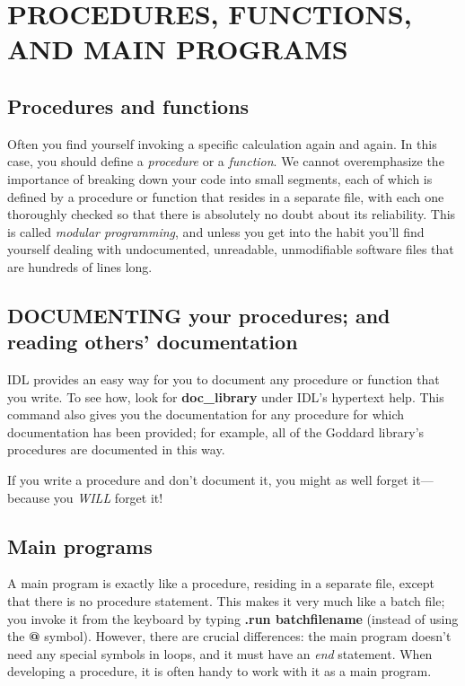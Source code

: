\documentclass[psfig,preprint]{aastex}
\begin{document}




\section{PROCEDURES, FUNCTIONS, AND MAIN PROGRAMS}

\subsection{Procedures and functions}

	Often you find yourself invoking a specific calculation again
and again.  In this case, you should define a {\it procedure} or a {\it
function}.  We cannot overemphasize the importance of breaking down your
code into small segments, each of which is defined by a procedure or
function that resides in a separate file, with each one thoroughly
checked so that there is absolutely no doubt about its reliability. 
This is called {\it modular programming}, and unless you get into the
habit you'll find yourself dealing with undocumented, unreadable,
unmodifiable software files that are hundreds of lines long. 

\subsection{DOCUMENTING your procedures; and reading others' documentation}

	IDL provides an easy way for you to document any procedure or
function that you write. To see how, look for {\bf doc\_library} under
IDL's hypertext help. This command also gives you the documentation for
any procedure for which documentation has been provided; for example,
all of the Goddard library's procedures are documented in this way.

	If you write a procedure and don't document it, you might as
well forget it---because you {\it WILL} forget it!

\subsection{Main programs}

	A main program is exactly like a procedure, residing in a
separate file, except that there is no procedure statement.  This makes
it very much like a batch file; you invoke it from the keyboard by
typing {\bf .run batchfilename} (instead of using the {\bf @} symbol). 
However, there are crucial differences: the main program doesn't need
any special symbols in loops, and it must have an {\it end} statement. 
When developing a procedure, it is often handy to work with it as a main
program. 
\end{document}
